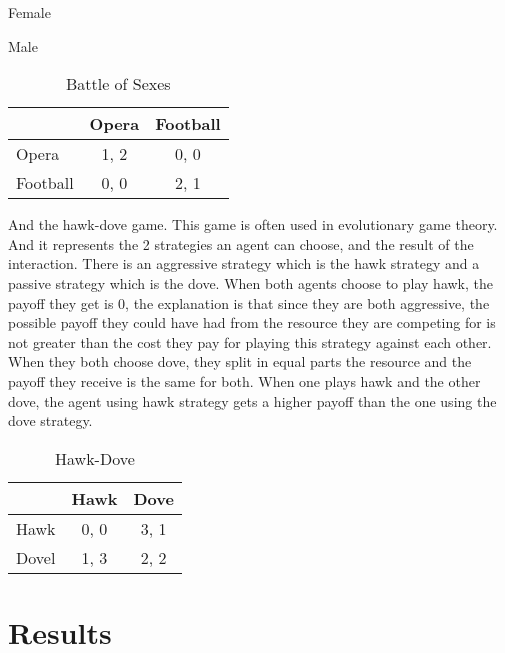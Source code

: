\documentclass{book}
\begin{document}
\begin{table}[h]
\begin{center}
Female


Male
\begin{tabular}{|l|c|c|}
\hline
 & Opera & Football \\ 
\hline
Opera & 1, 2 & 0, 0\\
\hline
 Football & 0, 0 & 2, 1\\
\hline
\end{tabular}
\end{center}
\caption{Battle of Sexes}
\label{tab:bostag}
\end{table}

And the hawk-dove game. This game is often used in  evolutionary game theory. And it represents the 2 strategies an agent can choose,  and the result of the interaction. There is an aggressive strategy which is the hawk strategy and a passive strategy which is the dove. When both agents choose to play hawk, the payoff they get is 0, the explanation is that since they are both aggressive, the possible payoff they could have had from the resource they are competing for is not greater than the cost they pay for playing this strategy against each other. When they both choose dove, they split in equal parts the resource and the payoff they receive is the same for both. When one plays hawk and the other dove, the agent using hawk strategy gets a higher payoff than the one using the dove strategy.    

\begin{table}[h]
\begin{center}
\begin{tabular}{|l|c|c|}
\hline
 & Hawk & Dove \\ 
\hline
Hawk & 0, 0 & 3, 1\\
\hline
 Dovel & 1, 3 & 2, 2\\
\hline
\end{tabular}
\end{center}
\caption{Hawk-Dove}
\label{tab:hdtag}
\end{table}

\newpage
\section{Results}
\end{document}
